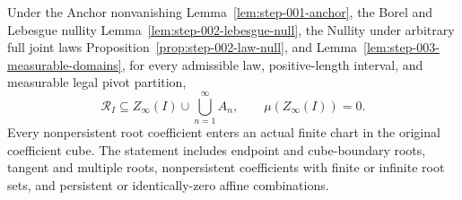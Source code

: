 \begin{lemma}
\label{lem:step-003-root-coverage}

Under the Anchor nonvanishing Lemma~\ref{lem:step-001-anchor}, the Borel and Lebesgue
nullity Lemma~\ref{lem:step-002-lebesgue-null}, the Nullity under arbitrary full joint laws
Proposition~\ref{prop:step-002-law-null}, and
Lemma~\ref{lem:step-003-measurable-domains}, for every admissible law, positive-length interval, and
measurable legal pivot partition,
\begin{equation}
\label{eq:appendix-display-092}
\mathcal R_I
\subseteq
Z_\infty(I)\cup\bigcup_{n=1}^{\infty}A_n,
\qquad
\mu(Z_\infty(I))=0.
\end{equation}
Every nonpersistent root coefficient enters an actual finite chart in the original coefficient cube. The
statement includes endpoint and cube-boundary roots, tangent and multiple roots, nonpersistent coefficients
with finite or infinite root sets, and persistent or identically-zero affine combinations.


\end{lemma}

